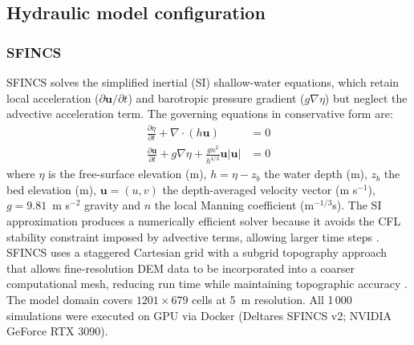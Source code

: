 \documentclass[review,12pt]{elsarticle}
\newcommand{\sfincs}{\textsc{SFINCS}}
\begin{document}
\subsection{Hydraulic model configuration}
\label{sec:models}

\subsubsection{\sfincs{}}
\sfincs{} \citep{deltares2023sfincs} solves the simplified inertial (SI)
shallow-water equations, which retain local acceleration ($\partial\mathbf{u}/\partial t$)
and barotropic pressure gradient ($g\nabla\eta$) but neglect the advective
acceleration term.
The governing equations in conservative form are:
\begin{align}
  \frac{\partial \eta}{\partial t} + \nabla\cdot(h\mathbf{u}) &= 0 \label{eq:sfincs_cont}\\
  \frac{\partial \mathbf{u}}{\partial t} + g\nabla\eta +
  \frac{g n^2}{h^{4/3}}\mathbf{u}|\mathbf{u}| &= 0 \label{eq:sfincs_mom}
\end{align}
where $\eta$ is the free-surface elevation (m), $h = \eta - z_b$ the water
depth (m), $z_b$ the bed elevation (m), $\mathbf{u} = (u,v)$ the
depth-averaged velocity vector (m s$^{-1}$), $g = 9.81$~m s$^{-2}$ gravity
and $n$ the local Manning coefficient (m$^{-1/3}$s).
The SI approximation produces a numerically efficient solver because
it avoids the CFL stability constraint imposed by advective terms,
allowing larger time steps \citep{bates2010}.
\sfincs{} uses a staggered Cartesian grid with a subgrid topography approach
that allows fine-resolution DEM data to be incorporated into a coarser
computational mesh, reducing run time while maintaining topographic accuracy
\citep{leijnse2021}.
The model domain covers $1201 \times 679$ cells at 5~m resolution.
All 1\,000 simulations were executed on GPU via Docker
(Deltares SFINCS v2; NVIDIA GeForce RTX 3090).
\end{document}
